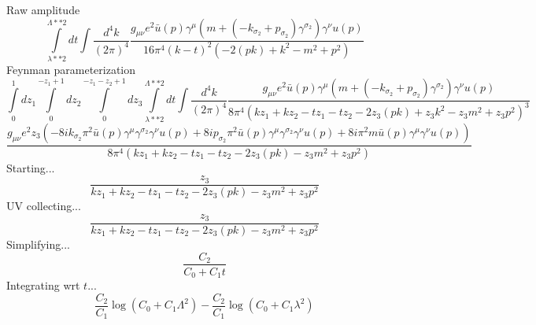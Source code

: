 Raw amplitude
\begin{dmath}\int\limits_{ \lambda**2 }^{ \Lambda**2 } dt\int\frac{d^4 k }{ (2\pi)^4 }\frac{g_{ \mu \nu } e^{2} { \bar{u}(p) } { \gamma^{ \mu } } \left(m + \left(- { { k }_{ \sigma_2 } } + { { p }_{ \sigma_2 } }\right) { \gamma^{ \sigma_2 } }\right) { \gamma^{ \nu } } u({ p })}{16 \pi^{4} \left(k - t\right)^{2} \left(- 2 {{ ( pk ) }} + {{ k^2 }} - {{ m^2 }} + {{ p^2 }}\right)}\end{dmath}
Feynman parameterization
\begin{dmath}\int\limits_{ 0 }^{ 1 } d{ z_{ 1 } }\int\limits_{ 0 }^{ -{ z_{ 1 } } + 1 } d{ z_{ 2 } }\int\limits_{ 0 }^{ -{ z_{ 1 } } - { z_{ 2 } } + 1 } d{ z_{ 3 } }\int\limits_{ \lambda**2 }^{ \Lambda**2 } dt\int\frac{d^4 k }{ (2\pi)^4 }\frac{g_{ \mu \nu } e^{2} { \bar{u}(p) } { \gamma^{ \mu } } \left(m + \left(- { { k }_{ \sigma_2 } } + { { p }_{ \sigma_2 } }\right) { \gamma^{ \sigma_2 } }\right) { \gamma^{ \nu } } u({ p })}{8 \pi^{4} \left(k { z_{ 1 } } + k { z_{ 2 } } - t { z_{ 1 } } - t { z_{ 2 } } - 2 { z_{ 3 } } {{ ( pk ) }} + { z_{ 3 } } {{ k^2 }} - { z_{ 3 } } {{ m^2 }} + { z_{ 3 } } {{ p^2 }}\right)^{3}}\end{dmath}
\begin{dmath}\frac{g_{ \mu \nu } e^{2} { z_{ 3 } } \left(- 8 i { { k }_{ \sigma_2 } } \pi^{2} { \bar{u}(p) } { \gamma^{ \mu } } { \gamma^{ \sigma_2 } } { \gamma^{ \nu } } u({ p }) + 8 i { { p }_{ \sigma_2 } } \pi^{2} { \bar{u}(p) } { \gamma^{ \mu } } { \gamma^{ \sigma_2 } } { \gamma^{ \nu } } u({ p }) + 8 i \pi^{2} m { \bar{u}(p) } { \gamma^{ \mu } } { \gamma^{ \nu } } u({ p })\right)}{8 \pi^{4} \left(k { z_{ 1 } } + k { z_{ 2 } } - t { z_{ 1 } } - t { z_{ 2 } } - 2 { z_{ 3 } } {{ ( pk ) }} - { z_{ 3 } } {{ m^2 }} + { z_{ 3 } } {{ p^2 }}\right)}\end{dmath}
Starting...
\begin{dmath}\frac{{ z_{ 3 } }}{k { z_{ 1 } } + k { z_{ 2 } } - t { z_{ 1 } } - t { z_{ 2 } } - 2 { z_{ 3 } } {{ ( pk ) }} - { z_{ 3 } } {{ m^2 }} + { z_{ 3 } } {{ p^2 }}}\end{dmath}
UV collecting...
\begin{dmath}\frac{{ z_{ 3 } }}{k { z_{ 1 } } + k { z_{ 2 } } - t { z_{ 1 } } - t { z_{ 2 } } - 2 { z_{ 3 } } {{ ( pk ) }} - { z_{ 3 } } {{ m^2 }} + { z_{ 3 } } {{ p^2 }}}\end{dmath}
Simplifying...
\begin{dmath}\frac{C_{ 2 }}{C_{ 0 } + C_{ 1 } t}\end{dmath}
Integrating wrt $t$...
\begin{dmath}\frac{C_{ 2 }}{C_{ 1 }} \log{\left (C_{ 0 } + C_{ 1 } \Lambda^{2} \right )} - \frac{C_{ 2 }}{C_{ 1 }} \log{\left (C_{ 0 } + C_{ 1 } \lambda^{2} \right )}\end{dmath}
